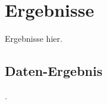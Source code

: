 
\section{Ergebnisse}
\label{sec:daten:ergebnisse}

Ergebnisse hier.

\subsection{Daten-Ergebnis}
\label{sec:daten_ergebnis}

.
